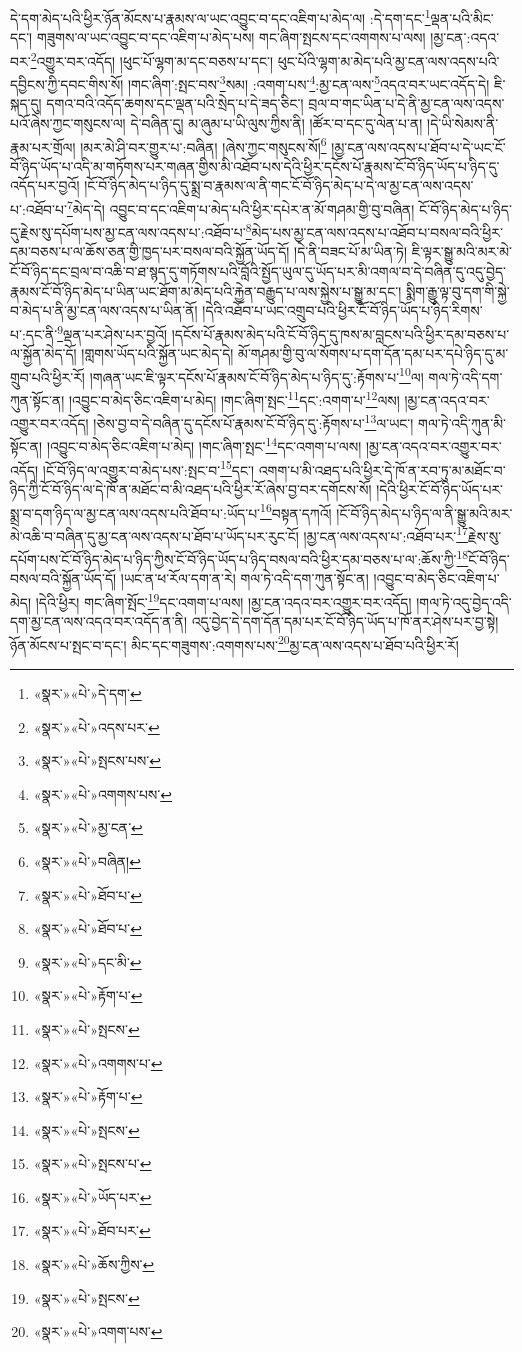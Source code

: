 དེ་དག་མེད་པའི་ཕྱིར་ཉོན་མོངས་པ་རྣམས་ལ་ཡང་འབྱུང་བ་དང་འཇིག་པ་མེད་ལ། :དེ་དག་དང་\footnote{«སྣར་»«པེ་»དེ་དག་}ལྡན་པའི་མིང་དང་། གཟུགས་ལ་ཡང་འབྱུང་བ་དང་འཇིག་པ་མེད་པས། གང་ཞིག་སྤངས་དང་འགགས་པ་ལས། །མྱ་ངན་:འདའ་བར་\footnote{«སྣར་»«པེ་»འདས་པར་}འགྱུར་བར་འདོད། །ཕུང་པོ་ལྷག་མ་དང་བཅས་པ་དང་། ཕུང་པོའི་ལྷག་མ་མེད་པའི་མྱ་ངན་ལས་འདས་པའི་དབྱིངས་ཀྱི་དབང་གིས་སོ། །གང་ཞིག་:སྤང་བས་\footnote{«སྣར་»«པེ་»སྤངས་པས་}སམ། :འགག་པས་\footnote{«སྣར་»«པེ་»འགགས་པས་}:མྱ་ངན་ལས་\footnote{«སྣར་»«པེ་»མྱ་ངན་}འདའ་བར་ཡང་འདོད་དེ། ཇི་སྐད་དུ། དགའ་བའི་འདོད་ཆགས་དང་ལྡན་པའི་སྲེད་པ་དེ་ཟད་ཅིང་། བྲལ་བ་གང་ཡིན་པ་དེ་ནི་མྱ་ངན་ལས་འདས་པའོ་ཞེས་ཀྱང་གསུངས་ལ། དེ་བཞིན་དུ། མ་ཞུམ་པ་ཡི་ལུས་ཀྱིས་ནི། །ཚོར་བ་དང་དུ་ལེན་པ་ན། །དེ་ཡི་སེམས་ནི་རྣམ་པར་གྲོལ། །མར་མེ་ཤི་བར་གྱུར་པ་:བཞིན། །ཞེས་ཀྱང་གསུངས་སོ།\footnote{«སྣར་»«པེ་»བཞིན།} །མྱ་ངན་ལས་འདས་པ་ཐོབ་པ་དེ་ཡང་ངོ་བོ་ཉིད་ཡོད་པ་འདི་མ་གཏོགས་པར་གཞན་གྱིས་མི་འཐོབ་པས་དེའི་ཕྱིར་དངོས་པོ་རྣམས་ངོ་བོ་ཉིད་ཡོད་པ་ཉིད་དུ་འདོད་པར་བྱའོ། །ངོ་བོ་ཉིད་མེད་པ་ཉིད་དུ་སྨྲ་བ་རྣམས་ལ་ནི་གང་ངོ་བོ་ཉིད་མེད་པ་དེ་ལ་མྱ་ངན་ལས་འདས་པ་:འཐོབ་པ་\footnote{«སྣར་»«པེ་»ཐོབ་པ་}མེད་དེ། འབྱུང་བ་དང་འཇིག་པ་མེད་པའི་ཕྱིར་དཔེར་ན་མོ་གཤམ་གྱི་བུ་བཞིན། ངོ་བོ་ཉིད་མེད་པ་ཉིད་དུ་རྗེས་སུ་དཔོག་པས་མྱ་ངན་ལས་འདས་པ་:འཐོབ་པ་\footnote{«སྣར་»«པེ་»ཐོབ་པ་}མེད་པས་མྱ་ངན་ལས་འདས་པ་འཐོབ་པ་བསལ་བའི་ཕྱིར་དམ་བཅས་པ་ལ་ཆོས་ཅན་གྱི་ཁྱད་པར་བསལ་བའི་སྐྱོན་ཡོད་དོ། །དེ་ནི་བཟང་པོ་མ་ཡིན་ཏེ། ཇི་ལྟར་སྒྱུ་མའི་མར་མེ་ངོ་བོ་ཉིད་དང་བྲལ་བ་འཆི་བ་ཐ་སྙད་དུ་གཏོགས་པའི་བློའི་སྤྱོད་ཡུལ་དུ་ཡོད་པར་མི་འགལ་བ་དེ་བཞིན་དུ་འདུ་བྱེད་རྣམས་ངོ་བོ་ཉིད་མེད་པ་ཡིན་ཡང་ཐོག་མ་མེད་པའི་རྐྱེན་བརྒྱུད་པ་ལས་སྐྱེས་པ་སྒྱུ་མ་དང་། སྨིག་རྒྱུ་ལྟ་བུ་དག་གི་སྐྱེ་བ་མེད་པ་ནི་མྱ་ངན་ལས་འདས་པ་ཡིན་ནོ། །དེའི་འཐོབ་པ་ཡང་འགྲུབ་པའི་ཕྱིར་ངོ་བོ་ཉིད་ཡོད་པ་ཉིད་རིགས་པ་:དང་ནི་\footnote{«སྣར་»«པེ་»དང་མི་}ལྡན་པར་ཤེས་པར་བྱའོ། །དངོས་པོ་རྣམས་མེད་པའི་ངོ་བོ་ཉིད་དུ་ཁས་མ་བླངས་པའི་ཕྱིར་དམ་བཅས་པ་ལ་སྐྱོན་མེད་དོ། །གླགས་ཡོད་པའི་སྐྱོན་ཡང་མེད་དེ། མོ་གཤམ་གྱི་བུ་ལ་སོགས་པ་དག་དོན་དམ་པར་དཔེ་ཉིད་དུ་མ་གྲུབ་པའི་ཕྱིར་རོ། །གཞན་ཡང་ཇི་ལྟར་དངོས་པོ་རྣམས་ངོ་བོ་ཉིད་མེད་པ་ཉིད་དུ་:རྟོགས་པ་\footnote{«སྣར་»«པེ་»རྟོག་པ་}ལ། གལ་ཏེ་འདི་དག་ཀུན་སྟོང་ན། །འབྱུང་བ་མེད་ཅིང་འཇིག་པ་མེད། །གང་ཞིག་སྤང་\footnote{«སྣར་»«པེ་»སྤངས་}དང་:འགག་པ་\footnote{«སྣར་»«པེ་»འགགས་པ་}ལས། །མྱ་ངན་འདའ་བར་འགྱུར་བར་འདོད། །ཅེས་བྱ་བ་དེ་བཞིན་དུ་དངོས་པོ་རྣམས་ངོ་བོ་ཉིད་དུ་:རྟོགས་པ་\footnote{«སྣར་»«པེ་»རྟོག་པ་}ལ་ཡང་། གལ་ཏེ་འདི་ཀུན་མི་སྟོང་ན། །འབྱུང་བ་མེད་ཅིང་འཇིག་པ་མེད། །གང་ཞིག་སྤང་\footnote{«སྣར་»«པེ་»སྤངས་}དང་འགག་པ་ལས། །མྱ་ངན་འདའ་བར་འགྱུར་བར་འདོད། །ངོ་བོ་ཉིད་ལ་འགྱུར་བ་མེད་པས་:སྤང་བ་\footnote{«སྣར་»«པེ་»སྤངས་པ་}དང་། འགག་པ་མི་འཐད་པའི་ཕྱིར་དེ་ཁོ་ན་རབ་ཏུ་མ་མཐོང་བ་ཉིད་ཀྱི་ངོ་བོ་ཉིད་ལ་དེ་ཁོ་ན་མཐོང་བ་མི་འཐད་པའི་ཕྱིར་རོ་ཞེས་བྱ་བར་དགོངས་སོ། །དེའི་ཕྱིར་ངོ་བོ་ཉིད་ཡོད་པར་སྨྲ་བ་དག་ཉིད་ལ་མྱ་ངན་ལས་འདས་པའི་ཐོབ་པ་:ཡོད་པ་\footnote{«སྣར་»«པེ་»ཡོད་པར་}བསྟན་དཀའོ། །ངོ་བོ་ཉིད་མེད་པ་ཉིད་ལ་ནི་སྒྱུ་མའི་མར་མེ་འཆི་བ་བཞིན་དུ་མྱ་ངན་ལས་འདས་པ་ཐོབ་པ་ཡོད་པར་རུང་ངོ། །མྱ་ངན་ལས་འདས་པ་:འཐོབ་པར་\footnote{«སྣར་»«པེ་»ཐོབ་པར་}རྗེས་སུ་དཔོག་པས་ངོ་བོ་ཉིད་མེད་པ་ཉིད་ཀྱིས་ངོ་བོ་ཉིད་ཡོད་པ་ཉིད་བསལ་བའི་ཕྱིར་དམ་བཅས་པ་ལ་:ཆོས་ཀྱི་\footnote{«སྣར་»«པེ་»ཆོས་ཀྱིས་}ངོ་བོ་ཉིད་བསལ་བའི་སྐྱོན་ཡོད་དོ། །ཡང་ན་ཕ་རོལ་དག་ན་རེ། གལ་ཏེ་འདི་དག་ཀུན་སྟོང་ན། །འབྱུང་བ་མེད་ཅིང་འཇིག་པ་མེད། །དེའི་ཕྱིར། གང་ཞིག་སྤོང་\footnote{«སྣར་»«པེ་»སྤངས་}དང་འགག་པ་ལས། །མྱ་ངན་འདའ་བར་འགྱུར་བར་འདོད། །གལ་ཏེ་འདུ་བྱེད་འདི་དག་མྱ་ངན་ལས་འདའ་བར་འདོད་ན་ནི། འདུ་བྱེད་དེ་དག་དོན་དམ་པར་ངོ་བོ་ཉིད་ཡོད་པ་ཁོ་ནར་ཤེས་པར་བྱ་སྟེ། ཉོན་མོངས་པ་སྤང་བ་དང་། མིང་དང་གཟུགས་:འགགས་པས་\footnote{«སྣར་»«པེ་»འགག་པས་}མྱ་ངན་ལས་འདས་པ་ཐོབ་པའི་ཕྱིར་རོ། 
